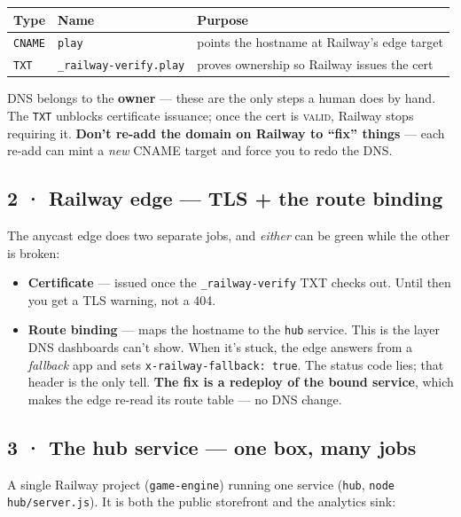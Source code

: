 \documentclass[11pt]{article}
\begin{document}
\begin{center}
\begin{tabular}{@{}llp{6.2cm}@{}}
\toprule
Type & Name & Purpose \\
\midrule
\texttt{CNAME} & \texttt{play} & points the hostname at Railway's edge target \\
\texttt{TXT} & \texttt{\_railway-verify.play} & proves ownership so Railway issues the cert \\
\bottomrule
\end{tabular}
\end{center}

\noindent DNS belongs to the \textbf{owner} --- these are the only steps a human does
by hand. The \texttt{TXT} unblocks certificate issuance; once the cert is
\textsc{valid}, Railway stops requiring it. \textbf{Don't re-add the domain on Railway
to ``fix'' things} --- each re-add can mint a \emph{new} CNAME target and force you to
redo the DNS.

\subsection{2 · Railway edge --- TLS + the route binding}
The anycast edge does two separate jobs, and \emph{either} can be green while the
other is broken:
\begin{itemize}[noitemsep,leftmargin=1.2em]
  \item \textbf{Certificate} --- issued once the \texttt{\_railway-verify} TXT checks
        out. Until then you get a TLS warning, not a 404.
  \item \textbf{Route binding} --- maps the hostname to the \texttt{hub} service. This
        is the layer DNS dashboards can't show. When it's stuck, the edge answers from
        a \emph{fallback} app and sets \texttt{x-railway-fallback: true}. The status
        code lies; that header is the only tell. \textbf{The fix is a redeploy of the
        bound service}, which makes the edge re-read its route table --- no DNS change.
\end{itemize}

\subsection{3 · The hub service --- one box, many jobs}
A single Railway project (\texttt{game-engine}) running one service (\texttt{hub},
\texttt{node hub/server.js}). It is both the public storefront and the analytics sink:
\end{document}
